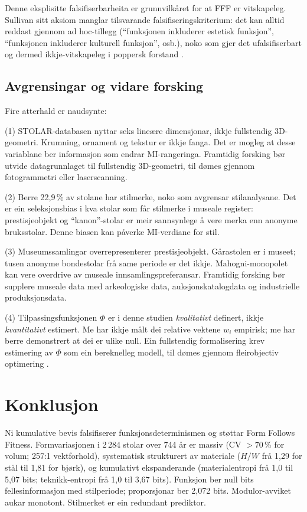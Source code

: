 \documentclass[10pt, a4paper, twocolumn]{article}
\begin{document}
\noindent Denne eksplisitte falsifiserbarheita er grunnvilkåret for at FFF er vitskapeleg. Sullivan sitt aksiom manglar tilsvarande falsifiseringskriterium: det kan alltid reddast gjennom ad hoc-tillegg (``funksjonen inkluderer estetisk funksjon'', ``funksjonen inkluderer kulturell funksjon'', osb.), noko som gjer det ufalsifiserbart og dermed ikkje-vitskapeleg i poppersk forstand \citep{popper1959}.


\subsection{Avgrensingar og vidare forsking}

Fire atterhald er naudsynte:

(1) STOLAR-databasen nyttar seks lineære dimensjonar, ikkje fullstendig 3D-geometri. Krumning, ornament og tekstur er ikkje fanga. Det er mogleg at desse variablane ber informasjon som endrar MI-rangeringa. Framtidig forsking bør utvide datagrunnlaget til fullstendig 3D-geometri, til dømes gjennom fotogrammetri eller laserscanning.

(2) Berre 22,9\,\% av stolane har stilmerke, noko som avgrensar stilanalysane. Det er ein seleksjonsbias i kva stolar som får stilmerke i museale register: prestisjeobjekt og ``kanon''-stolar er meir sannsynlege å vere merka enn anonyme bruksstolar. Denne biasen kan påverke MI-verdiane for stil.

(3) Museumssamlingar overrepresenterer prestisjeobjekt. Gårastolen er i museet; tusen anonyme bondestolar frå same periode er det ikkje. Mahogni-monopolet kan vere overdrive av museale innsamlingspreferansar. Framtidig forsking bør supplere museale data med arkeologiske data, auksjonskatalogdata og industrielle produksjonsdata.

(4) Tilpassingsfunksjonen $\Phi$ er i denne studien \emph{kvalitativt} definert, ikkje \emph{kvantitativt} estimert. Me har ikkje målt dei relative vektene $w_i$ empirisk; me har berre demonstrert at dei er ulike null. Ein fullstendig formalisering krev estimering av $\Phi$ som ein bereknelleg modell, til dømes gjennom fleirobjectiv optimering \citep{deb2001}.


\section{Konklusjon}

Ni kumulative bevis falsifiserer funksjonsdeterminismen og støttar Form Follows Fitness. Formvariasjonen i 2\,284 stolar over 744 år er massiv (CV $> 70$\,\% for volum; 257:1 vektforhold), systematisk strukturert av materiale ($H/W$ frå 1,29 for stål til 1,81 for bjørk), og kumulativt ekspanderande (materialentropi frå 1,0 til 5,07 bits; teknikk-entropi frå 1,0 til 3,67 bits). Funksjon ber null bits fellesinformasjon med stilperiode; proporsjonar ber 2,072 bits. Modulor-avviket aukar monotont. Stilmerket er ein redundant prediktor.
\end{document}
